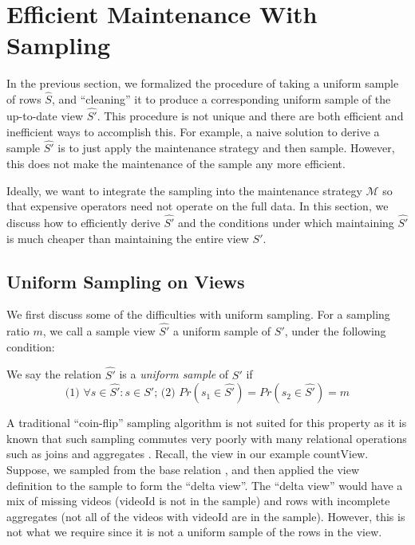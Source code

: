 \section{Efficient Maintenance With Sampling} \label{sampling}
In the previous section, we formalized the procedure of taking a uniform sample of rows $\hat{S}$, and ``cleaning'' it to produce a corresponding uniform sample of the up-to-date view $\hat{S'}$.
This procedure is not unique and there are both efficient and inefficient ways to accomplish this. 
For example, a naive solution to derive a sample $\hat{S'}$ is to just apply the maintenance strategy and then sample.
However, this does not make the maintenance of the sample any more efficient.

Ideally, we want to integrate the sampling into the maintenance strategy $\mathcal{M}$ so that expensive operators
need not operate on the full data.
In this section, we discuss how to efficiently derive $\hat{S'}$ and the conditions under which
maintaining $\hat{S'}$ is much cheaper than maintaining the entire view $S'$.

\subsection{Uniform Sampling on Views}
We first discuss some of the difficulties with uniform sampling.
For a sampling ratio $m$, we call a sample view $\hat{S'}$ a uniform sample of $S'$, under the following condition:
\begin{definition} We say the relation $\hat{S'}$ is a \emph{uniform sample} of $S'$ if
\[\text{(1) } \forall s \in \hat{S'} : s \in S'\text{; (2) }Pr(s_1 \in \hat{S'}) =  Pr(s_2 \in \hat{S'}) = m\]
\end{definition}
A traditional ``coin-flip'' sampling algorithm is not suited for this property as it is known that such sampling commutes very poorly with many relational operations such as joins and aggregates \cite{chaudhuri1999random}.
Recall, the view in our example \textsf{countView}. 
Suppose, we sampled from the base relation , and then applied the view definition to the sample to form the ``delta view''.
The ``delta view'' would have a mix of missing videos (\textsf{videoId} is not in the sample) and rows with incomplete aggregates (not all of the videos with \textsf{videoId} are in the sample).
However, this is not what we require since it is not a uniform sample of the rows in the view. 

